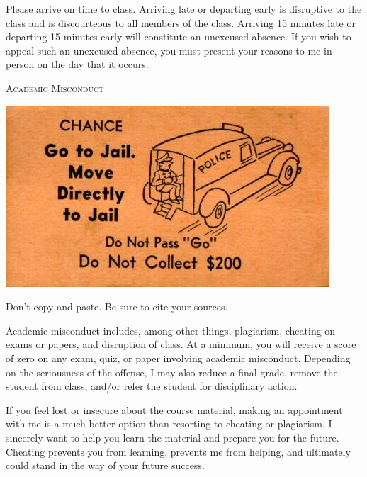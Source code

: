 \documentclass{tufte-handout}
\begin{document}
Please arrive on time to class. Arriving late or departing early is disruptive to the class and is discourteous to all members of the class. Arriving 15 minutes late or departing 15 minutes early will constitute an unexcused absence. If you wish to appeal such an unexcused absence, you must present your reasons to me in-person on the day that it occurs.

\begin{center}
\textsc{Academic Misconduct}
\end{center}

\begin{marginfigure}%
  \includegraphics[width=\linewidth]{../assets/gotojail.jpg}
  \caption{Don't copy and paste. Be sure to cite your sources.}
  \label{fig:marginfig}
\end{marginfigure}

Academic misconduct includes, among other things, plagiarism, cheating on exams or papers, and disruption of class. At a minimum, you will receive a score of zero on any exam, quiz, or paper involving academic misconduct. Depending on the seriousness of the offense, I may also reduce a final grade, remove the student from class, and/or refer the student for disciplinary action.

If you feel lost or insecure about the course material, making an appointment with me is a much better option than resorting to cheating or plagiarism. I sincerely want to help you learn the material and prepare you for the future. Cheating prevents you from learning, prevents me from helping, and ultimately could stand in the way of your future success.

\end{document}
